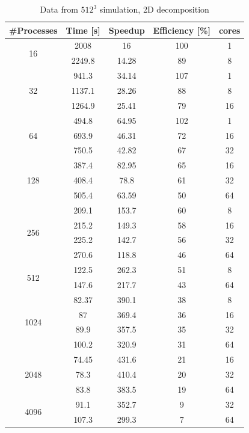 \begin{table}
\caption{Data from $512^{3}$ simulation, 2D decomposition}
\begin{center}
\begin{tabular}{c c c c c}
\toprule
\textbf{\#Processes} & \textbf{Time [s]} & \textbf{Speedup} & \textbf{Efficiency [\%]} & \textbf{cores}\\
\midrule
\multirow{2}{*}{16} &  2008 & 16 & 100 & 1\\
& 2249.8 & 14.28 & 89 & 8\\
\hline
\multirow{3}{*}{32} & 941.3 & 34.14 & 107 &1\\
& 1137.1 & 28.26 & 88 & 8\\
& 1264.9 & 25.41 & 79 & 16\\
\hline
\multirow{3}{*}{64} & 494.8 & 64.95 & 102 & 1\\
& 693.9 & 46.31 & 72 & 16\\
& 750.5 & 42.82 & 67 & 32\\
\hline
\multirow{3}{*}{128} & 387.4 & 82.95 & 65 & 16\\
& 408.4 & 78.8 & 61 & 32\\
& 505.4 & 63.59 & 50 & 64\\
\hline
\multirow{4}{*}{256} & 209.1 & 153.7 & 60 & 8\\
& 215.2 & 149.3 & 58 & 16\\
& 225.2 & 142.7 & 56 & 32\\
& 270.6 & 118.8 & 46 & 64\\
\hline
\multirow{2}{*}{512} & 122.5 & 262.3 & 51 & 8\\
& 147.6 & 217.7 & 43 & 64\\
\hline
\multirow{4}{*}{1024} & 82.37 & 390.1 & 38 & 8\\
& 87 & 369.4 & 36 & 16\\
& 89.9 & 357.5 & 35 & 32\\
& 100.2 & 320.9 & 31& 64\\
\hline
\multirow{3}{*}{2048} & 74.45 & 431.6 & 21 & 16\\
& 78.3 & 410.4 & 20 & 32\\
& 83.8 & 383.5 & 19 & 64\\
\hline
\multirow{2}{*}{4096} & 91.1 & 352.7 & 9 & 32\\
& 107.3 & 299.3 & 7 & 64\\
\bottomrule
\end{tabular}
\end{center}
\label{512data:multi}
\end{table}


